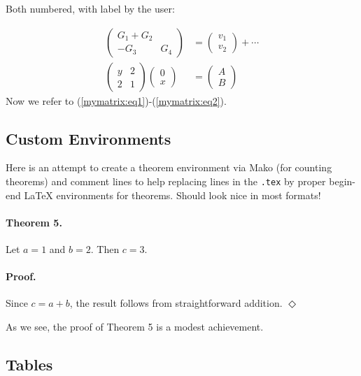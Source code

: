 \n\documentclass[%
oneside,                 %
final,                   %
10pt]{article}
\theoremstyle{definition}
\begin{document}
\begin{enumerate}
Both numbered, with label by the user:

\begin{align}
\begin{pmatrix}
G_1 + G_2\\ 
-G_3 & G_4
\end{pmatrix}
&=
\begin{pmatrix}
 v_1 \\ 
 v_2
\end{pmatrix}
+ \cdots \label{mymatrix:eq1}
\\ 
\label{mymatrix:eq2}
\left(\begin{array}{ll}
y & 2\\ 
2 & 1
\end{array}\right)
\left(\begin{array}{ll}
0 \\ x
\end{array}\right)
&= \begin{pmatrix}
A \\ B
\end{pmatrix}
\end{align}
Now we refer to (\ref{mymatrix:eq1})-(\ref{mymatrix:eq2}).

\subsection{Custom Environments}

Here is an attempt to create a theorem environment via Mako
(for counting theorems) and comment lines to help replacing lines in
the \texttt{.tex} by proper begin-end {\LaTeX} environments for theorems.
Should look nice in most formats!

\label{theorem:fundamental1}

\paragraph{Theorem 5.}
Let $a=1$ and $b=2$. Then $c=3$.

\paragraph{Proof.}
Since $c=a+b$, the result follows from straightforward addition.
$\Diamond$

As we see, the proof of Theorem 5 is a modest
achievement.

\subsection{Tables}
\label{subsec:table}


\end{enumerate}
\end{document}
